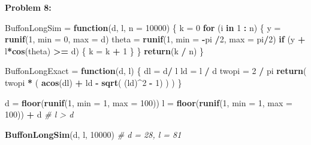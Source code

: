 \documentclass[11pt]{article}
\newcommand{\skipline}{\vspace{\baselineskip}}
\newenvironment{problem}[1]{\textbf{Problem #1:}}{\newpage}
\newenvironment{Shaded}{\begin{snugshade}}{\end{snugshade}}
\newcommand{\CommentTok}[1]{\textcolor[rgb]{0.56,0.35,0.01}{\textit{#1}}}
\newcommand{\ControlFlowTok}[1]{\textcolor[rgb]{0.13,0.29,0.53}{\textbf{#1}}}
\newcommand{\DataTypeTok}[1]{\textcolor[rgb]{0.13,0.29,0.53}{#1}}
\newcommand{\DecValTok}[1]{\textcolor[rgb]{0.00,0.00,0.81}{#1}}
\newcommand{\KeywordTok}[1]{\textcolor[rgb]{0.13,0.29,0.53}{\textbf{#1}}}
\newcommand{\NormalTok}[1]{#1}
\newcommand{\OperatorTok}[1]{\textcolor[rgb]{0.81,0.36,0.00}{\textbf{#1}}}
\newcommand{\StringTok}[1]{\textcolor[rgb]{0.31,0.60,0.02}{#1}}
\begin{document}
\begin{problem}{8}
\begin{enumerate}[label = (\alph*)]
\begin{Shaded}
\begin{Highlighting}[]
\NormalTok{BuffonLongSim =}\StringTok{ }\ControlFlowTok{function}\NormalTok{(d, l, }\DataTypeTok{n =} \DecValTok{10000}\NormalTok{) \{}
\NormalTok{  k =}\StringTok{ }\DecValTok{0}
  \ControlFlowTok{for}\NormalTok{ (i }\ControlFlowTok{in} \DecValTok{1} \OperatorTok{:}\StringTok{ }\NormalTok{n) \{}
\NormalTok{    y =}\StringTok{ }\KeywordTok{runif}\NormalTok{(}\DecValTok{1}\NormalTok{, }\DataTypeTok{min =} \DecValTok{0}\NormalTok{, }\DataTypeTok{max =}\NormalTok{ d)}
\NormalTok{    theta =}\StringTok{ }\KeywordTok{runif}\NormalTok{(}\DecValTok{1}\NormalTok{, }\DataTypeTok{min =} \OperatorTok{-}\NormalTok{pi }\OperatorTok{/}\DecValTok{2}\NormalTok{, }\DataTypeTok{max =}\NormalTok{ pi}\OperatorTok{/}\DecValTok{2}\NormalTok{)}
    \ControlFlowTok{if}\NormalTok{ (y }\OperatorTok{+}\StringTok{ }\NormalTok{l}\OperatorTok{*}\KeywordTok{cos}\NormalTok{(theta) }\OperatorTok{>=}\StringTok{ }\NormalTok{d) \{}
\NormalTok{      k =}\StringTok{ }\NormalTok{k }\OperatorTok{+}\StringTok{ }\DecValTok{1}
\NormalTok{    \}}
\NormalTok{  \}}
\KeywordTok{return}\NormalTok{(k }\OperatorTok{/}\StringTok{ }\NormalTok{n)}
\NormalTok{\}}

\NormalTok{BuffonLongExact =}\StringTok{ }\ControlFlowTok{function}\NormalTok{(d, l) \{}
\NormalTok{  dl =}\StringTok{ }\NormalTok{d}\OperatorTok{/}\StringTok{ }\NormalTok{l}
\NormalTok{  ld =}\StringTok{ }\NormalTok{l }\OperatorTok{/}\StringTok{ }\NormalTok{d}
\NormalTok{  twopi =}\StringTok{ }\DecValTok{2} \OperatorTok{/}\StringTok{ }\NormalTok{pi}
  \KeywordTok{return}\NormalTok{( twopi }\OperatorTok{*}\StringTok{ }\NormalTok{( }\KeywordTok{acos}\NormalTok{(dl) }\OperatorTok{+}\StringTok{ }\NormalTok{ld }\OperatorTok{-}\StringTok{ }\KeywordTok{sqrt}\NormalTok{( (ld)}\OperatorTok{^}\DecValTok{2} \OperatorTok{-}\StringTok{ }\DecValTok{1}\NormalTok{) ) )}
\NormalTok{\}}
\end{Highlighting}
\end{Shaded}
\skipline
\begin{Shaded}
\begin{Highlighting}[]
\NormalTok{d =}\StringTok{ }\KeywordTok{floor}\NormalTok{(}\KeywordTok{runif}\NormalTok{(}\DecValTok{1}\NormalTok{, }\DataTypeTok{min =} \DecValTok{1}\NormalTok{, }\DataTypeTok{max =} \DecValTok{100}\NormalTok{))}
\NormalTok{l =}\StringTok{ }\KeywordTok{floor}\NormalTok{(}\KeywordTok{runif}\NormalTok{(}\DecValTok{1}\NormalTok{, }\DataTypeTok{min =} \DecValTok{1}\NormalTok{, }\DataTypeTok{max =} \DecValTok{100}\NormalTok{)) }\OperatorTok{+}\StringTok{ }\NormalTok{d   }\CommentTok{# l > d}
\end{Highlighting}
\end{Shaded}
\begin{Shaded}
\begin{Highlighting}[]
\KeywordTok{BuffonLongSim}\NormalTok{(d, l, }\DecValTok{10000}\NormalTok{)} \CommentTok{# d = 28, l = 81}
\end{Highlighting}
\end{Shaded}


\end{enumerate}
\end{problem}
\end{document}
